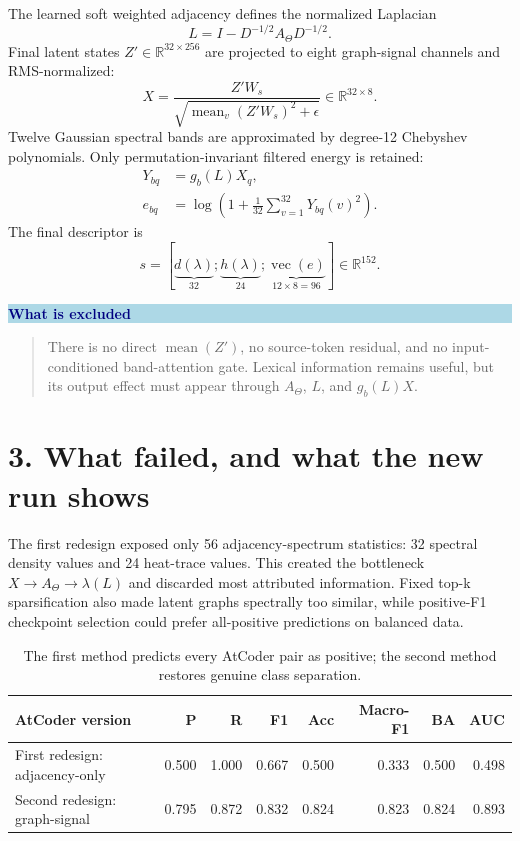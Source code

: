 \documentclass[10pt,a4paper]{article}
\newcommand{\R}{\mathbb{R}}
\newenvironment{summarybox}[2]{%
  \begin{center}\begin{minipage}{0.95\linewidth}
  \colorbox{#1}{\parbox{0.96\linewidth}{\textcolor{navy}{\textbf{#2}}\par\smallskip}}
  \vspace{-6pt}\begin{quote}
}{\end{quote}\end{minipage}\end{center}}
\begin{document}
The learned soft weighted adjacency defines the normalized Laplacian
\begin{equation}
L=I-D^{-1/2}A_\Theta D^{-1/2}.
\end{equation}
Final latent states $Z'\in\R^{32\times256}$ are projected to eight graph-signal
channels and RMS-normalized:
\begin{equation}
X=\frac{Z'W_s}{\sqrt{\operatorname{mean}_v(Z'W_s)^2+\epsilon}}
\in\R^{32\times8}.
\end{equation}
Twelve Gaussian spectral bands are approximated by degree-12 Chebyshev
polynomials. Only permutation-invariant filtered energy is retained:
\begin{align}
Y_{bq}&=g_b(L)X_q,\\
e_{bq}&=\log\left(1+\frac{1}{32}\sum_{v=1}^{32}Y_{bq}(v)^2\right).
\end{align}
The final descriptor is
\begin{equation}
s=[\underbrace{d(\lambda)}_{32};
\underbrace{h(\lambda)}_{24};
\underbrace{\operatorname{vec}(e)}_{12\times8=96}]
\in\R^{152}.
\end{equation}

\begin{summarybox}{lightblue}{What is excluded}
There is no direct $\operatorname{mean}(Z')$, no source-token residual, and no
input-conditioned band-attention gate. Lexical information remains useful, but
its output effect must appear through $A_\Theta$, $L$, and $g_b(L)X$.
\end{summarybox}

\clearpage
\section*{3. What failed, and what the new run shows}

The first redesign exposed only 56 adjacency-spectrum statistics: 32 spectral
density values and 24 heat-trace values. This created the bottleneck
$X\rightarrow A_\Theta\rightarrow\lambda(L)$ and discarded most attributed
information. Fixed top-k sparsification also made latent graphs spectrally too
similar, while positive-F1 checkpoint selection could prefer all-positive
predictions on balanced data.

\begin{table}[H]
\centering
\small
\begin{tabular}{lrrrrrrr}
\toprule
AtCoder version & P & R & F1 & Acc & Macro-F1 & BA & AUC \\
\midrule
First redesign: adjacency-only & 0.500 & 1.000 & 0.667 & 0.500 & 0.333 & 0.500 & 0.498 \\
Second redesign: graph-signal & 0.795 & 0.872 & 0.832 & 0.824 & 0.823 & 0.824 & 0.893 \\
\bottomrule
\end{tabular}
\caption{The first method predicts every AtCoder pair as positive; the second
method restores genuine class separation.}
\end{table}
\end{document}
